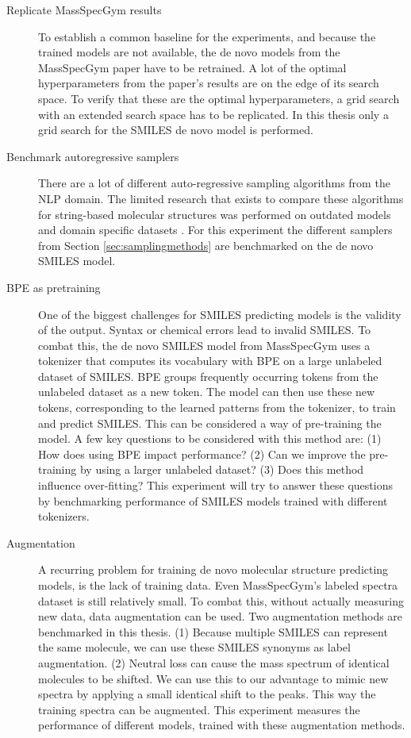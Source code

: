 \begin{description}
    \item[Replicate MassSpecGym results]
    To establish a common baseline for the experiments, and because the trained models are not available, the de novo models from the MassSpecGym paper \cite{bushuiev2024massspecgym} have to be retrained.
    A lot of the optimal hyperparameters from the paper's results are on the edge of its search space.
    To verify that these are the optimal hyperparameters, a grid search with an extended search space has to be replicated.
    In this thesis only a grid search for the SMILES de novo model is performed.
    
    \item[Benchmark autoregressive samplers]
    There are a lot of different auto-regressive sampling algorithms from the \ac{NLP} domain.
    The limited research that exists to compare these algorithms for string-based molecular structures was performed on outdated models and domain specific datasets \cite{stravs2022msnovelist}.
    For this experiment the different samplers from Section \ref{sec:samplingmethods} are benchmarked on the de novo SMILES model.
    
    \item[\acf{BPE} as pretraining]
    One of the biggest challenges for SMILES predicting models is the validity of the output. Syntax or chemical errors lead to invalid SMILES.
    To combat this, the de novo SMILES model from MassSpecGym uses a tokenizer that computes its vocabulary with \ac{BPE} on a large unlabeled dataset of SMILES.
    \ac{BPE} groups frequently occurring tokens from the unlabeled dataset as a new token.
    The model can then use these new tokens, corresponding to the learned patterns from the tokenizer, to train and predict SMILES.
    This can be considered a way of pre-training the model.
    A few key questions to be considered with this method are:
    (1) How does using \ac{BPE} impact performance?
    (2) Can we improve the pre-training by using a larger unlabeled dataset?
    (3) Does this method influence over-fitting?
    This experiment will try to answer these questions by benchmarking performance of SMILES models trained with different tokenizers.

    \item[Augmentation]
    A recurring problem for training de novo molecular structure predicting models, is the lack of training data.
    Even MassSpecGym's labeled spectra dataset is still relatively small.
    To combat this, without actually measuring new data, data augmentation can be used. 
    Two augmentation methods are benchmarked in this thesis.
    (1) Because multiple SMILES can represent the same molecule, we can use these SMILES synonyms as label augmentation.
    (2) Neutral loss can cause the mass spectrum of identical molecules to be shifted.
    We can use this to our advantage to mimic new spectra by applying a small identical shift to the peaks.
    This way the training spectra can be augmented.
    This experiment measures the performance of different models, trained with these augmentation methods.


\end{description}
